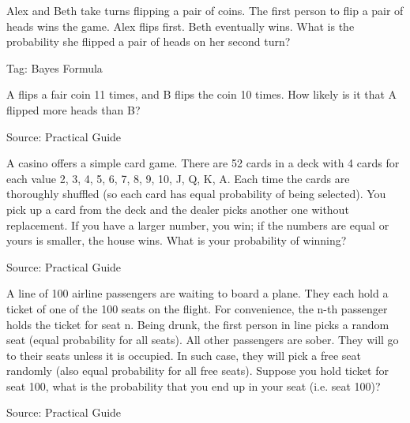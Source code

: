\begin{exe}
Alex and Beth take turns flipping a pair of coins. The first person to flip a pair of heads wins the game. Alex flips first. Beth eventually wins. What is the probability she flipped a pair of heads on her second turn?
\end{exe}
Tag: Bayes Formula
\begin{teacher}
\begin{sol}
\end{sol}
\end{teacher}

\begin{exe}
A flips a fair coin 11 times, and B flips the coin 10 times. How likely is it that A flipped more heads than B?
\end{exe}
Source: Practical Guide
\begin{teacher}
\begin{sol}
\end{sol}
\end{teacher}

\begin{exe}
A casino offers a simple card game. There are 52 cards in a deck with 4 cards for each
value 2, 3, 4, 5, 6, 7, 8, 9, 10, J, Q, K, A. Each time the cards are thoroughly shuffled
(so each card has equal probability of being selected). You pick up a card from the deck
and the dealer picks another one without replacement. If you have a larger number, you
win; if the numbers are equal or yours is smaller, the house wins. What is your probability of winning? 
\end{exe}
Source: Practical Guide
\begin{teacher}
\begin{sol}
\end{sol}
\end{teacher}


\begin{exe}
A line of 100 airline passengers are waiting to board a plane. They each hold a ticket of one of the 100 seats on the flight. For convenience, the n-th passenger holds the ticket for seat n. Being drunk, the first person in line picks a random seat (equal probability for all seats). All other passengers are sober. They will go to their seats unless it is occupied. In such case, they will pick a free seat randomly (also equal probability for all free seats). Suppose you hold ticket for seat 100, what is the probability that you end up in your seat (i.e. seat 100)?
\end{exe}
\begin{teacher}
Source: Practical Guide
\begin{sol}
\end{sol}
\end{teacher}

